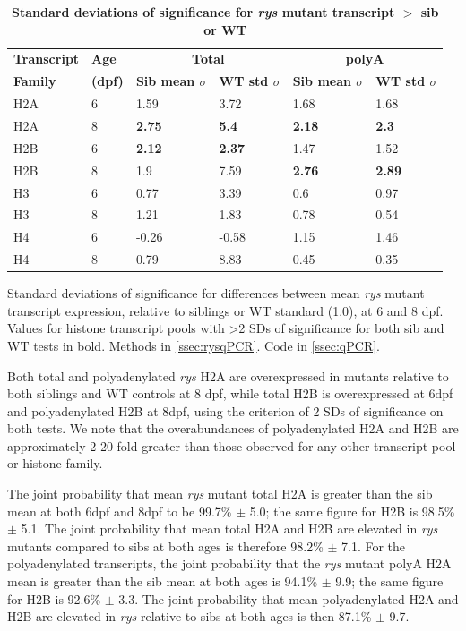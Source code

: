 \documentclass{ut-thesis}
\begin{document}
\begin{NoHyper}
\begin{table}[!ht]
    \centering
    \caption{{\bf Standard deviations of significance for \textit{rys} mutant transcript $>$ sib or WT}}
    \begin{tabular}{|l|l|l|l|l|l|} 
        \hline {\bf Transcript} & {\bf Age} & \multicolumn{2}{c|}{\bf{Total}} & \multicolumn{2}{c|}{\bf{polyA}}\\ \cline{3-6}
        {\bf Family} & {\bf (dpf)} & {\bf Sib mean $\sigma$} & {\bf WT std $\sigma$} & {\bf Sib mean $\sigma$} & {\bf WT std $\sigma$}\\ \hline 
        H2A & 6 & 1.59 & 3.72 & 1.68 & 1.68\\ \hline
        H2A & 8 & {\bf 2.75} & {\bf 5.4} & {\bf 2.18} & {\bf 2.3}\\ \hline
        H2B & 6 & {\bf 2.12} & {\bf 2.37} & 1.47 & 1.52\\ \hline
        H2B & 8 & 1.9 & 7.59 & {\bf 2.76} & {\bf 2.89}\\ \hline
        H3 & 6 & 0.77 & 3.39 & 0.6 & 0.97\\ \hline
        H3 & 8 & 1.21 & 1.83 & 0.78 & 0.54\\ \hline
        H4 & 6 & -0.26 & -0.58 & 1.15 & 1.46\\ \hline
        H4 & 8 & 0.79 & 8.83 & 0.45 & 0.35\\ \hline
    \end{tabular}
    \begin{flushleft}    \label{qPCRstds}
    Standard deviations of significance for differences between mean \textit{rys} mutant transcript expression, relative to siblings or WT standard (1.0), at 6 and 8 dpf. Values for histone transcript pools with \textgreater2 SDs of significance for both sib and WT tests in bold. 
    Methods in \autoref{ssec:rysqPCR}.
    Code in \autoref{ssec:qPCR}.
    \end{flushleft}
\end{table}

Both total and polyadenylated \textit{rys} H2A are overexpressed in mutants relative to both siblings and WT controls at 8 dpf, while total H2B is overexpressed at 6dpf and polyadenylated H2B at 8dpf, using the criterion of 2 SDs of significance on both tests. We note that the overabundances of polyadenylated H2A and H2B are approximately 2-20 fold greater than those observed for any other transcript pool or histone family. 

The joint probability that mean \textit{rys} mutant total H2A is greater than the sib mean at both 6dpf and 8dpf to be 99.7\% $\pm$ 5.0; the same figure for H2B is 98.5\% $\pm$ 5.1. The joint probability that mean total H2A and H2B are elevated in \textit{rys} mutants compared to sibs at both ages is therefore 98.2\% $\pm$ 7.1. For the polyadenylated transcripts, the joint probability that the \textit{rys} mutant polyA H2A mean is greater than the sib mean at both ages is 94.1\% $\pm$ 9.9; the same figure for H2B is 92.6\% $\pm$ 3.3. The joint probability that mean polyadenylated H2A and H2B are elevated in \textit{rys} relative to sibs at both ages is then 87.1\% $\pm$ 9.7. 


\end{NoHyper}
\end{document}
